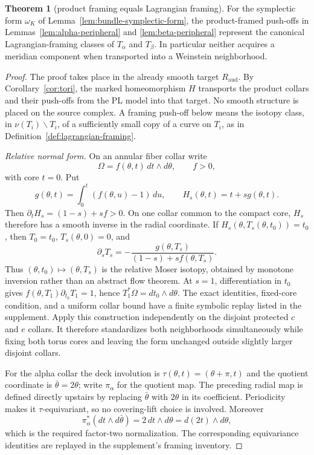 \documentclass[11pt]{article}
\theoremstyle{definition}
\newtheorem{theorem}{Theorem}[section]
\begin{document}
\begin{theorem}[product framing equals Lagrangian framing]
\label{thm:framing}
For the symplectic form $\omega_K$ of
Lemma~\ref{lem:bundle-symplectic-form}, the product-framed
push-offs in Lemmas~\ref{lem:alpha-peripheral} and
\ref{lem:beta-peripheral} represent the canonical Lagrangian-framing classes
of $T_\alpha$ and $T_\beta$.  In particular neither acquires a meridian
component when transported into a Weinstein neighborhood.
\end{theorem}

\begin{proof}
The proof takes place in the already smooth target $R_{\mathrm{aud}}$.  By
Corollary~\ref{cor:tori}, the marked homeomorphism $H$ transports the product
collars and their push-offs from the PL model into that target.  No smooth
structure is placed on the source complex.  A framing push-off below means
the isotopy class, in $\nu(T_i)\smallsetminus T_i$, of a sufficiently small
copy of a curve on $T_i$, as in
Definition~\ref{def:lagrangian-framing}.

\emph{Relative normal form.}  On an annular fiber collar write
\[
 \Omega=f(\theta,t)\,dt\wedge d\theta,\qquad f>0,
\]
with core $t=0$.  Put
\[
 g(\theta,t)=\int_0^t(f(\theta,u)-1)\,du,\qquad
 H_s(\theta,t)=t+s g(\theta,t).
\]
Then $\partial_tH_s=(1-s)+sf>0$.  On one collar common to the compact core,
$H_s$ therefore has a smooth inverse in the radial coordinate.  If
$H_s(\theta,T_s(\theta,t_0))=t_0$, then $T_0=t_0$, $T_s(\theta,0)=0$, and
\[
 \partial_sT_s=-\frac{g(\theta,T_s)}{(1-s)+sf(\theta,T_s)}.
\]
Thus $(\theta,t_0)\mapsto(\theta,T_s)$ is the relative Moser isotopy, obtained
by monotone inversion rather than an abstract flow theorem.  At $s=1$,
differentiation in $t_0$ gives
$f(\theta,T_1)\partial_{t_0}T_1=1$, hence
$T_1^*\Omega=dt_0\wedge d\theta$.  The exact identities, fixed-core
condition, and a uniform collar bound have a finite symbolic replay listed
in the supplement.
Apply this construction independently on the disjoint protected $c$ and $e$
collars.  It therefore standardizes both neighborhoods simultaneously while
fixing both torus cores and leaving the form unchanged outside slightly
larger disjoint collars.

For the alpha collar the deck involution is
$\tau(\theta,t)=(\theta+\pi,t)$ and the quotient coordinate is
$\bar\theta=2\theta$; write $\pi_\alpha$ for the quotient map.  The preceding radial map is defined directly upstairs
by replacing $\bar\theta$ with $2\theta$ in its coefficient.  Periodicity
makes it $\tau$-equivariant, so no covering-lift choice is involved.  Moreover
\[
 \pi_\alpha^*(dt\wedge d\bar\theta)=2\,dt\wedge d\theta
   =d(2t)\wedge d\theta,
\]
which is the required factor-two normalization.  The corresponding
equivariance identities are replayed in the supplement's framing inventory.


\end{proof}
\end{document}
